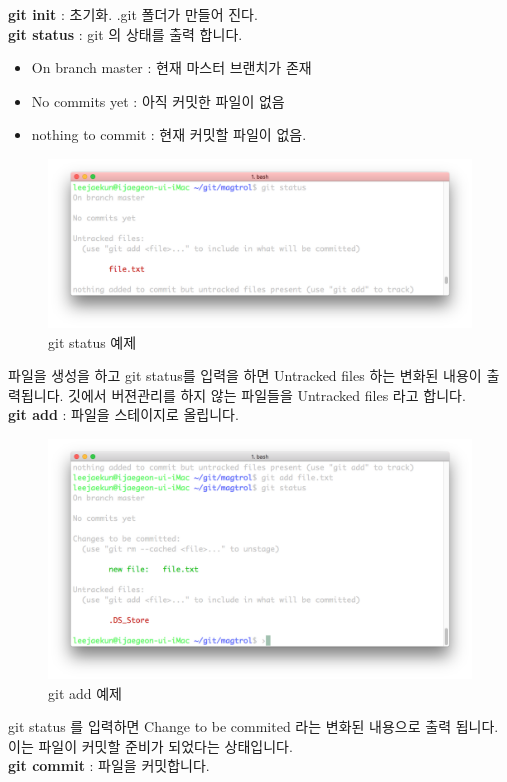 \noindent \textbf{git init} : 초기화. .git 폴더가 만들어 진다.\\
%
\textbf{git status} : git 의 상태를 출력 합니다.\\
%
\begin{itemize}
	\item On branch master : 현재 마스터 브랜치가 존재
	\item No commits yet : 아직 커밋한 파일이 없음 
	\item nothing to commit : 현재 커밋할 파일이 없음.
\end{itemize}
%
\begin{figure} [!htbp] %
	\centering
	\captionsetup{justification=centering,margin=1cm}
	\includegraphics[width=0.7\linewidth]{./fig/status.png}
	\caption{git status 예제}
	\label{fig:status}
\end{figure} 
%
파일을 생성을 하고 git status를 입력을 하면 Untracked files 하는 변화된 내용이 출력됩니다.
깃에서 버젼관리를 하지 않는 파일들을 Untracked files 라고 합니다.\\
%
\textbf{git add} : 파일을 스테이지로 올립니다.
%
\begin{figure} [!htbp] %
	\centering
	\captionsetup{justification=centering,margin=1cm}
	\includegraphics[width=0.7\linewidth]{./fig/add.png}
	\caption{git add 예제}
	\label{fig:add}
\end{figure} 
%
git status 를 입력하면 Change to be commited 라는 변화된 내용으로 출력 됩니다.
이는 파일이 커밋할 준비가 되었다는 상태입니다. \\
%
\noindent \textbf{git commit} : 파일을 커밋합니다. \\
